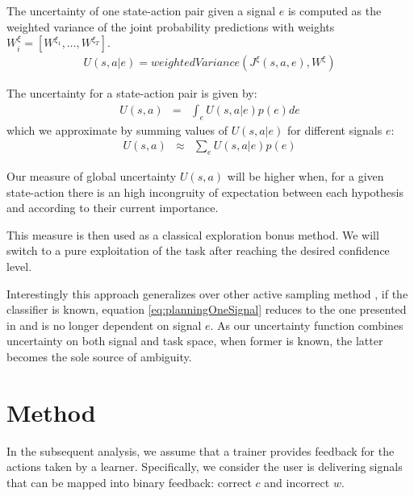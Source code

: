 The uncertainty of one state-action pair given a signal $e$ is computed as the weighted variance of the joint probability predictions with weights $W_{i}^{\xi} = [W^{\xi_1}, \ldots, W^{\xi_T}]$.
\begin{eqnarray}
U(s,a|e) = weightedVariance(J^{\xi}(s,a,e), W^{\xi})
\label{eq:planningOneSignal}
\end{eqnarray}

The uncertainty for a state-action pair is given by:
\begin{eqnarray}
U(s,a) & = & \int_{e} U(s,a|e) p(e) de
\end{eqnarray}
which we approximate by summing values of $U(s,a|e)$ for different signals $e$:
\begin{eqnarray}
U(s,a) & \approx & \sum_{e} U(s,a|e) p(e)
\label{eq:planning}
\end{eqnarray}

Our measure of global uncertainty $U(s,a)$ will be higher when, for a given state-action there is an high incongruity of expectation between each hypothesis and according to their current importance. 

This measure is then used as a classical exploration bonus method. We will switch to a pure exploitation of the task after reaching the desired confidence level.

Interestingly this approach generalizes over other active sampling method \cite{lopes2009active}, if the classifier is known, equation \ref{eq:planningOneSignal} reduces to the one presented in \cite{macl11simul} and is no longer dependent on signal $e$. As our uncertainty function combines uncertainty on both signal and task space, when former is known, the latter becomes the sole source of ambiguity.


\section{Method}

In the subsequent analysis, we assume that a trainer provides feedback for the actions taken by a learner. Specifically, we consider the user is delivering signals that can be mapped into binary feedback: correct $c$ and incorrect $w$. 

